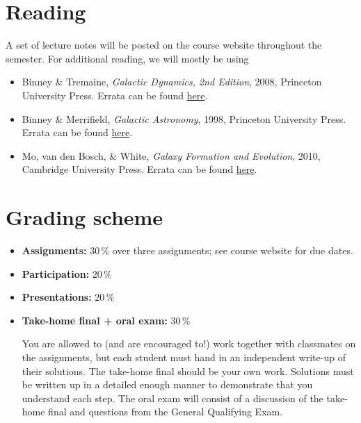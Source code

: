 \documentclass{article}
\begin{document}
\section*{Reading}

A set of lecture notes will be posted on the course website throughout
 the semester. For additional reading, we will mostly be using

\begin{itemize}

  \item Binney \& Tremaine, \emph{Galactic Dynamics, 2nd Edition},
    2008, Princeton University Press. Errata can be found
    \href{https://www-thphys.physics.ox.ac.uk/people/JamesBinney/web/index\_files/BT2errors.pdf}{here}.

  \item Binney \& Merrifield, \emph{Galactic Astronomy},
    1998, Princeton University Press. Errata can be found
    \href{http://www-thphys.physics.ox.ac.uk/people/JamesBinney/bmerrors.pdf}{here}.

  \item Mo, van den Bosch, \& White, \emph{Galaxy Formation and Evolution},
    2010, Cambridge University Press. Errata can be found
    \href{http://people.umass.edu/hjmo/book/errata.pdf}{here}.

\end{itemize}

\section*{Grading scheme}

\begin{itemize}

  \item {\bf Assignments:} 30\,\% over three assignments; see course website for due dates.

  \item {\bf Participation:} 20\,\%

  \item {\bf Presentations:} 20\,\%

  \item {\bf Take-home final + oral exam:} 30\,\%

You are allowed to (and are encouraged to!) work together with
classmates on the assignments, but each student must hand in an
independent write-up of their solutions. The take-home final should be
your own work. Solutions must be written up in a detailed enough
manner to demonstrate that you understand each step. The oral exam
will consist of a discussion of the take-home final and questions from
the General Qualifying Exam.

\end{itemize}
\end{document}
